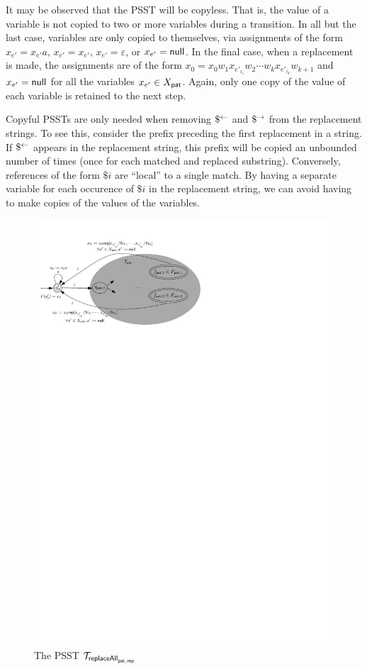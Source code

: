 It may be observed that the PSST will be copyless.
That is, the value of a variable is not copied to two or more variables during a transition.
In all but the last case, variables are only copied to themselves, via assignments of the form $x_{e'} = x_{e'} a$, $x_{e'} = x_{e'}$, $x_{e'} = \varepsilon$, or $x_{e'} = \mathsf{null}$.
In the final case, when a replacement is made, the assignments are of the form
$x_0 = x_0 w_1 x_{e'_{i_1}} w_2 \cdots w_k x_{e'_{i_k}} w_{k+1}$
and
$x_{e'} = \mathsf{null}$ for all the variables $x_{e'} \in X_{\mathsf{pat}}$.
Again, only one copy of the value of each variable is retained to the next step.

Copyful PSSTs are only needed when removing $\$^{\leftarrow}$ and $\$^{\rightarrow}$ from the replacement strings.
To see this, consider the prefix preceding the first replacement in a string.
If $\$^{\leftarrow}$ appears in the replacement string, this prefix will be copied an unbounded number of times (once for each matched and replaced substring).
Conversely, references of the form $\$i$ are ``local'' to a single match.
By having a separate variable for each occurence of $\$i$ in the replacement string, we can avoid having to make copies of the values of the variables.

\begin{figure}[ht]
    \centering
    \includegraphics[scale=0.7]{psst-replaceall.pdf}
    \caption{The PSST $\mathcal{T}_{\mathsf{replaceAll}_{\mathsf{pat},\mathsf{rep}}}$}
    \label{fig-psst-replaceall}
\end{figure}


